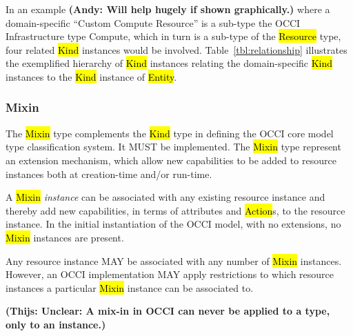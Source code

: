\documentclass[10pt,a4paper]{article}
\begin{document}
In an example \textbf{(Andy: Will help hugely if shown graphically.)} where a 
domain-specific ``Custom Compute Resource'' is a sub-type
the OCCI Infrastructure type Compute, which in turn is a sub-type of the
\hl{Resource} type, four related \hl{Kind} instances would be involved.
%
Table~\ref{tbl:relationship} illustrates the exemplified hierarchy of \hl{Kind}
instances relating the domain-specific \hl{Kind} instances to the \hl{Kind}
instance of \hl{Entity}.


\subsubsection{Mixin}
The \hl{Mixin} type complements the \hl{Kind} type in defining the
OCCI core model type classification system. It MUST be implemented. The \hl{Mixin}
type represent an extension mechanism, which allow new capabilities to
be added to resource instances both at creation-time and/or run-time.

A \hl{Mixin} {\em instance} can be associated with any existing resource
instance and thereby add new capabilities, in terms of attributes and
\hl{Action}s, to the resource instance. In the initial instantiation of the OCCI
model, with no extensions, no \hl{Mixin} instances are present.

Any resource instance MAY be associated with any number of \hl{Mixin}
instances.  However, an OCCI implementation MAY apply restrictions to which
resource instances a particular \hl{Mixin} instance can be associated to.

\textbf{(Thijs: Unclear: A mix-in in OCCI can never be applied to a type, only to an instance.)}
\end{document}
